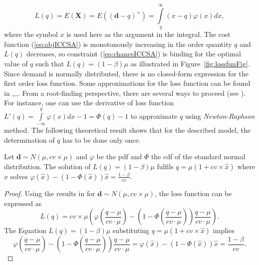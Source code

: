 %
\begin{equation}
L(q) = E(\boldsymbol{X})=E\left((\boldsymbol{d}-q)^+\right)= \int\limits_{q}^{\infty} (x-q)\varphi(x)dx,
\end{equation}
%
where the symbol $x$ is used here as the argument in the integral. The cost function (\ref{eq:objICCSA}) is monotonously increasing in the order quantity $q$ and $L(q)$ decreases, so constraint (\ref{eq:chanceICCSA}) is binding for the optimal value of $q$ such that $L(q) = (1-\beta) \mu$ as illustrated in Figure~\ref{fig:lossfunFig}. Since demand is normally distributed, there is no closed-form expression for the first order loss function.  Some approximations for the loss function can be found in  \cite{kurawarwala96},\cite{Rossi14},\cite{DeSchrijver20121375},\cite{Waissi199691}. From a root-finding perspective, there are several ways to proceed (see \cite{HENTO10}). For instance, one can use the derivative of loss function  $L'(q)=\int\limits_{-\infty}^{q}\varphi(x)dx - 1 = \Phi(q) - 1$ to approximate $q$ using \emph{Newton-Raphson} method. The following theoretical result shows that for the described model, the determination of $q$ has to be done only once.
%
\begin{lemma}
\label{lem:q1}
Let $\boldsymbol{d}\sim N(\mu,cv\times \mu)$ and $\varphi$ be the pdf and $\Phi$ the cdf of the standard normal distribution. The solution of  $L(q) = (1-\beta) \mu$ fulfils $q=\mu(1+cv\times\hat x)$ where $\hat x$ solves
$\varphi\left(\hat x\right)-\left(1-\Phi\left(\hat x\right)\right)\hat x =\frac{1-\beta}{cv}$.
\end{lemma}
%
\begin{proof}
Using the results in \cite{Rossi14} for $\boldsymbol{d}\sim N(\mu,cv\times\mu)$,  the loss function can be expressed as
%
\begin{equation}
\label{eq:rossi}
L(q)=cv\times\mu \left(\varphi\left(\frac{q-\mu}{cv\cdot\mu}\right)-\left(1-\Phi\left(\frac{q-\mu}{cv\cdot\mu}\right)\right)\frac{q-\mu}{cv\cdot\mu}\right) .
 \end{equation}
The Equation $L(q)=(1-\beta)\mu$ substituting $q=\mu(1+cv\times\hat x)$ implies
%
\begin{equation}
\label{eq:rossi2}
 \varphi\left(\frac{q-\mu}{cv\cdot \mu}\right)-\left(1-\Phi\left(\frac{q-\mu}{cv\cdot \mu}\right)\right)\frac{q-\mu}{cv\cdot \mu} =
\varphi(\hat x)-(1-\Phi(\hat x))\hat x =
 \frac{1-\beta}{cv} .
 \end{equation}
\end{proof}
%
